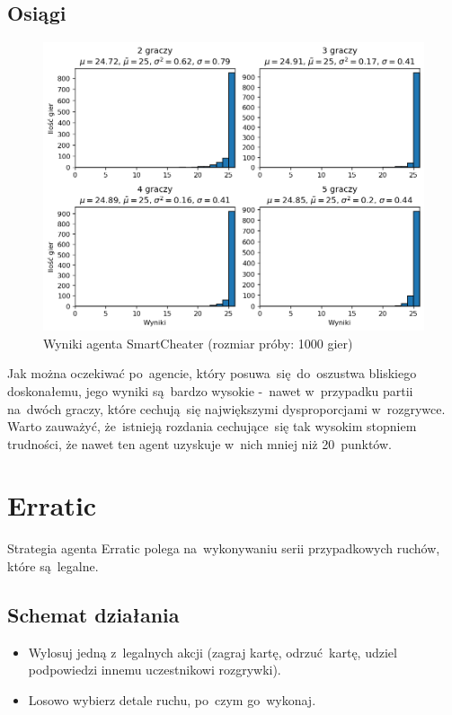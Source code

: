 \documentclass[declaration,shortabstract,inz]{iithesis}
\begin{document}
\subsection*{Osiągi}

\begin{figure}[H]
	\centering
	\captionsetup{format=hang}
	\includegraphics[width=\textwidth,height=\textheight,keepaspectratio]{SmartCheater.png}
	\caption[Caption]{Wyniki agenta SmartCheater (rozmiar próby: 1000 gier)}
	\label{fig:SmartCheater}
\end{figure}

Jak można oczekiwać po~agencie, który posuwa~się do~oszustwa bliskiego doskonałemu, jego wyniki są~bardzo wysokie -~nawet w~przypadku partii na~dwóch graczy, które cechują~się największymi dysproporcjami w~rozgrywce. Warto zauważyć, że~istnieją rozdania cechujące~się tak wysokim stopniem trudności, że nawet ten agent uzyskuje w~nich mniej niż 20~punktów.

\section{Erratic}

Strategia agenta Erratic polega na~wykonywaniu serii przypadkowych ruchów, które są~legalne.

\subsection*{Schemat działania}

\begin{itemize}
	\item Wylosuj jedną z~legalnych akcji (zagraj kartę, odrzuć kartę, udziel podpowiedzi innemu uczestnikowi rozgrywki).
	\item Losowo wybierz detale ruchu, po~czym go~wykonaj.
\end{itemize}
\end{document}
